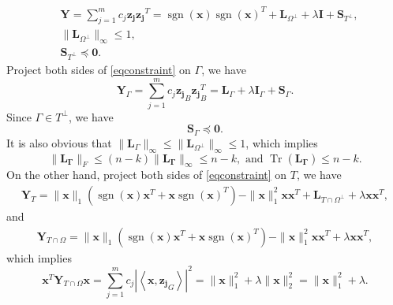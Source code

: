 \documentclass[11pt]{article}
\newcommand{\<}{\langle}
\renewcommand{\>}{\rangle}
\newcommand{\vct}[1]{\bm{#1}}
\newcommand{\mtx}[1]{\bm{#1}}
\newcommand{\sgn}{\operatorname{sgn}}
\newcommand{\tr}{\operatorname{Tr}}
\numberwithin{equation}{section}
\newcommand{\Tp}{T^\perp}
\newcommand{\Op}{\Omega^{\perp}}
\begin{document}
\begin{align}
\label{eqconstraint}
&\mtx{Y} = \sum_{j=1}^{m}c_j \vct{z_j }\vct{z_j}^T = \sgn(\vct{x})\sgn(\vct{x})^T + \mtx{L}_{\Op} + \lambda \mtx{I} + \mtx{S}_
{\Tp},\\
\label{ineqconstraint1}
&\|\mtx{L}_{\Op}\|_{\infty} \leq 1,\\
\label{ineqconstraint2}
&\mtx{S}_{\Tp} \preceq \mtx{0}.
\end{align}
Project both sides of \eqref{eqconstraint} on $\Gamma$, we have
\begin{equation}
\label{keyequation1}
\mtx{Y}_\Gamma=\sum_{j=1}^{m}c_j {\vct{z_j }}_B{\vct{z_j}}_B^T = \mtx{L}_{\Gamma} + \lambda \mtx{I}_\Gamma + \mtx{S}_\Gamma.
\end{equation}
Since $\Gamma \in T^\perp$, we have 
\begin{equation}
\label{S_Gamma}
\mtx{S}_\Gamma \preceq \mtx{0}.
\end{equation}
 It is also obvious that $\|\mtx{L}_{\Gamma} \|_\infty\leq \|\mtx{L}_{\Omega^\perp} \|_\infty\leq 1$, which implies
 \begin{equation}
 \label{L_Gamma}
 \|\mtx{L_\Gamma}\|_F\leq (n-k)\|\mtx{L_\Gamma}\|_\infty\leq n-k, \text{~and~} \tr(\mtx{L_\Gamma})\leq n-k.
 \end{equation}
 On the other hand, project both sides of \eqref{eqconstraint} on $T$, we have
\begin{align*}
\mtx{Y}_T =\|\vct{x}\|_1 (\sgn(\vct{x})\vct{x}^T + \vct{x}\sgn(\vct{x})^T) - \|\vct{x}\|_1^2 \vct{x}\vct{x}^T+  \mtx{L}_{T
\cap{\Omega^\perp}} +\lambda \vct{x}\vct{x}^T ,
\end{align*}
and
\begin{align*}
\mtx{Y}_{T\cap \Omega} =\|\vct{x}\|_1 (\sgn(\vct{x})\vct{x}^T + \vct{x}\sgn(\vct{x})^T) -\|\vct{x}\|_1^2\vct{x}\vct{x}^T  
+\lambda \vct{x}\vct{x}^T ,
\end{align*}
which implies
\begin{equation}
\label{keyequation2}
\vct{x}^T\mtx{Y}_{T\cap \Omega}\vct{x} = \sum_{j=1}^{m}c_j \left\vert\left<\vct{x}, {\vct{z_j}}_G\right>\right\vert^2  = \|
\vct{x}\|_1^2 +\lambda \|\vct{x}\|_2^2= \|\vct{x}\|_1^2 + \lambda.
\end{equation}
\end{document}
